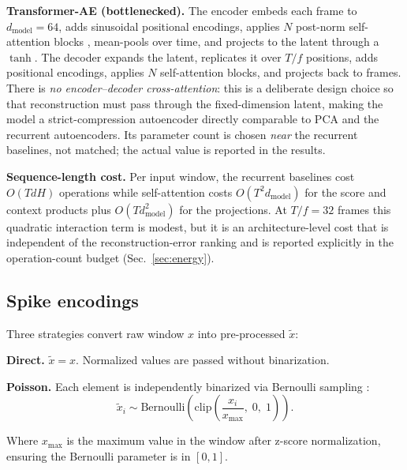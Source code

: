 \documentclass[conference]{IEEEtran}
\begin{document}
\par \textbf{Transformer-AE (bottlenecked).} The encoder embeds each frame to
$d_{\mathrm{model}}=64$, adds sinusoidal positional encodings, applies $N$
post-norm self-attention blocks \cite{vaswani2017attention,ba2016layernorm},
mean-pools over time, and projects to the latent through a $\tanh$. The decoder
expands the latent, replicates it over $T/f$ positions, adds positional
encodings, applies $N$ self-attention blocks, and projects back to frames. There
is \emph{no encoder--decoder cross-attention}: this is a deliberate
design choice so that reconstruction must pass through the fixed-dimension
latent, making the model a strict-compression autoencoder directly comparable to
PCA and the recurrent autoencoders. Its parameter count is chosen \emph{near}
the recurrent baselines, not matched; the actual value is reported in the
results.

\par \textbf{Sequence-length cost.} Per input window, the recurrent baselines
cost $O(T d H)$ operations while self-attention costs $O(T^2 d_{\mathrm{model}})$
for the score and context products plus $O(T d_{\mathrm{model}}^2)$ for the
projections. At $T/f = 32$ frames this quadratic interaction term is modest, but
it is an architecture-level cost that is independent of the reconstruction-error
ranking and is reported explicitly in the operation-count budget
(Sec.~\ref{sec:energy}).

\subsection{Spike encodings}
\label{sec:encodings}

\par Three strategies convert raw window $x$ into pre-processed $\tilde{x}$:

\textbf{Direct.} $\tilde{x} = x$.  Normalized values are passed without
binarization.

\textbf{Poisson.}  Each element is independently binarized via Bernoulli
sampling \cite{neftci2019surrogate}:
\begin{equation}
  \tilde{x}_i \sim \mathrm{Bernoulli}\!\left(\mathrm{clip}\!\left(
    \frac{x_i}{x_{\max}},\;0,\;1\right)\right).
\end{equation}
\par Where $x_{\max}$ is the maximum value in the window after z-score normalization, 
     ensuring the Bernoulli parameter is in $[0,1]$.
\end{document}

